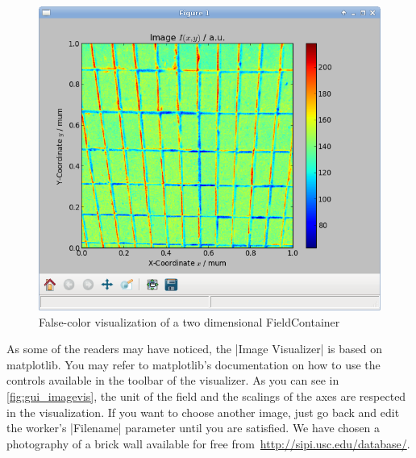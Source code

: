 \documentclass[a4paper]{article}
\begin{document}
\begin{figure}[h]
  \centering
  \includegraphics[scale=0.75]{fig/gui_imagevis.png}
  \caption{False-color visualization of a two dimensional FieldContainer}
  \label{fig:gui_imagevis}
\end{figure}
As some of the readers may have noticed, the |Image Visualizer| is
based on matplotlib\cite{matplotlib}. You may refer to matplotlib's
documentation on how to use the controls available in the toolbar of
the visualizer. As you can see in \autoref{fig:gui_imagevis}, the unit
of the field and the scalings of the axes are respected in the
visualization. If you want to choose another image, just go back and
edit the worker's |Filename| parameter until you are satisfied. We
have chosen a photography of a brick wall available for free
from~\url{http://sipi.usc.edu/database/}.
\end{document}
